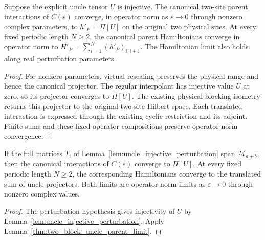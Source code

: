 \begin{lemma}
    \label{thm:two_block_uncle_parent_limit}
    \leanok
    Suppose the explicit uncle tensor $U$ is injective. The canonical
    two-site parent interactions of $C(\varepsilon)$ converge, in operator
    norm as $\varepsilon\to0$ through nonzero complex parameters, to
    $h'_P=\Pi[U]$ on the original two physical sites. At every fixed periodic
    length $N\ge2$, the canonical parent Hamiltonians converge in operator norm
    to $H'_P=\sum_{i=1}^N(h'_P)_{i,i+1}$. The Hamiltonian limit also holds along real
    perturbation parameters.
\end{lemma}
\begin{proof}
    \leanok
    For nonzero parameters, virtual rescaling preserves the physical range
    and hence the canonical projector. The regular interpolant has injective
    value $U$ at zero, so its projector converges to $\Pi[U]$. The existing
    physical-blocking isometry returns this projector to the original
    two-site Hilbert space. Each translated interaction is expressed through
    the existing cyclic restriction and its adjoint. Finite sums and these
    fixed operator compositions preserve operator-norm convergence.
\end{proof}

\begin{lemma}
    \label{cor:uncle_parent_limit_injective_perturbation}
    \leanok
    If the full matrices $T_i$ of Lemma~\ref{lem:uncle_injective_perturbation}
    span $\mathcal M_{a+b}$, then the canonical interactions of
    $C(\varepsilon)$ converge to $\Pi[U]$. At every fixed periodic length
    $N\geq2$, the corresponding Hamiltonians converge to the translated
    sum of uncle projectors. Both limits are operator-norm limits as
    $\varepsilon\to0$ through nonzero complex values.
\end{lemma}
\begin{proof}
    \leanok
    The perturbation hypothesis gives injectivity of $U$ by
    Lemma~\ref{lem:uncle_injective_perturbation}. Apply
    Lemma~\ref{thm:two_block_uncle_parent_limit}.
\end{proof}

